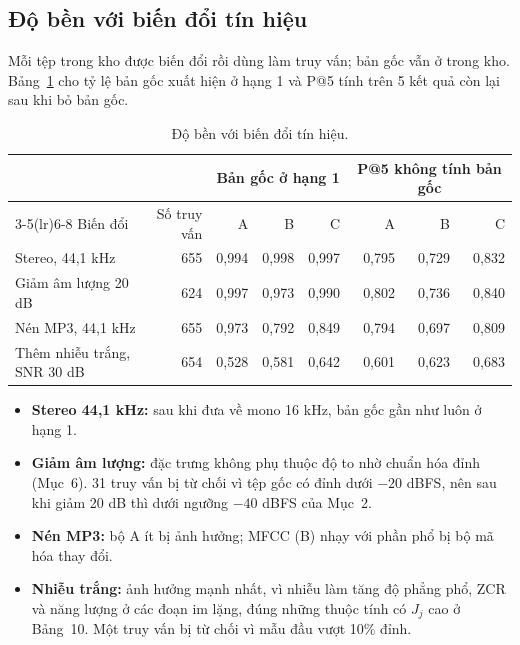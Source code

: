 \documentclass[11pt,a4paper]{article}
\begin{document}
\subsection{Độ bền với biến đổi tín hiệu}\label{sec:doben}
Mỗi tệp trong kho được biến đổi rồi dùng làm truy vấn; bản gốc vẫn ở trong kho. Bảng~\ref{tab:doben} cho tỷ lệ bản gốc xuất hiện ở hạng 1 và P@5 tính trên 5 kết quả còn lại sau khi bỏ bản gốc.
\begin{table}[htbp]
\centering\small
\caption{Độ bền với biến đổi tín hiệu.}\label{tab:doben}
\begin{tabular}{lrrrrrrr}
\toprule
& & \multicolumn{3}{c}{Bản gốc ở hạng 1} & \multicolumn{3}{c}{P@5 không tính bản gốc}\\
\cmidrule(lr){3-5}\cmidrule(lr){6-8}
Biến đổi & Số truy vấn & A & B & C & A & B & C\\\midrule
Stereo, 44,1 kHz & 655 & 0,994 & 0,998 & 0,997 & 0,795 & 0,729 & 0,832\\
Giảm âm lượng 20 dB & 624 & 0,997 & 0,973 & 0,990 & 0,802 & 0,736 & 0,840\\
Nén MP3, 44,1 kHz & 655 & 0,973 & 0,792 & 0,849 & 0,794 & 0,697 & 0,809\\
Thêm nhiễu trắng, SNR 30 dB & 654 & 0,528 & 0,581 & 0,642 & 0,601 & 0,623 & 0,683\\\bottomrule
\end{tabular}
\end{table}
\begin{itemize}
\item \textbf{Stereo 44,1 kHz:} sau khi đưa về mono 16 kHz, bản gốc gần như luôn ở hạng 1.
\item \textbf{Giảm âm lượng:} đặc trưng không phụ thuộc độ to nhờ chuẩn hóa đỉnh (Mục~6). 31 truy vấn bị từ chối vì tệp gốc có đỉnh dưới $-20$ dBFS, nên sau khi giảm 20 dB thì dưới ngưỡng $-40$ dBFS của Mục~2.
\item \textbf{Nén MP3:} bộ A ít bị ảnh hưởng; MFCC (B) nhạy với phần phổ bị bộ mã hóa thay đổi.
\item \textbf{Nhiễu trắng:} ảnh hưởng mạnh nhất, vì nhiễu làm tăng độ phẳng phổ, ZCR và năng lượng ở các đoạn im lặng, đúng những thuộc tính có $J_j$ cao ở Bảng~10. Một truy vấn bị từ chối vì mẫu đầu vượt 10\% đỉnh.
\end{itemize}
\end{document}
